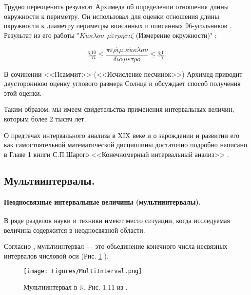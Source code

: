 \documentclass[a5paper,openany]{book}
\begin{document}
Трудно переоценить результат Архимеда об определении отношения длины окружности к периметру. Он использовал для оценки отношения длины окружности к диаметру периметры вписанных и описанных 96-угольников \cite{Archimedes}. Результат из его работы "$K \acute{u} \kappa \lambda o \upsilon \ \  \mu \acute{\varepsilon} \tau \rho \eta \sigma \iota \zeta$ (Измерение окружности)" : 

\begin{equation*}
3\tfrac{10}{71} \leq 
\dfrac{\pi \varepsilon \rho \acute{\iota} \mu. \kappa \acute{u} \kappa \lambda o \upsilon}{\delta \iota \acute{\alpha} \mu \varepsilon \tau \rho o} 
\leq 3\tfrac{1}{7}.
\end{equation*}

В сочинении <<Псаммит>> (<<Исчисление песчинок>>) Архимед приводит двустороннюю оценку углового размера Солнца и обсуждает способ получения этой оценки.

Таким образом, мы имеем свидетельства применения интервальных величин, которым более 2 тысяч лет.

О предтечах интервального анализа в XIX веке и о зарождении и развитии его как самостоятельной математической дисциплины достаточно подробно написано в Главе 1 книги С.П.Шарого <<Конечномерный интервальный анализ>> \cite{SharyBook}.

\subsection{Мультиинтервалы.}\label{s:MultiIntervals}

\paragraph{Неодносвязные интервальные величины (мультиинтервалы).}

В ряде разделов науки и техники имеют место ситуации, когда исследуемая величина  содержится в неодносвязной области. %

Согласно \cite{SharyBook}, мультиинтервал --- это объединение конечного числа несвязных интервалов числовой оси (Рис. \ref{f:MultiInterval} ). 

\begin{figure}[ht]
\centering
\texttt{[image: Figures/MultiInterval.png]}
\caption{Мультиинтервал в $\mathbb{R}$. Рис. 1.11 из \cite{SharyBook}.}
\label{f:MultiInterval} 
\end{figure}
\end{document}
